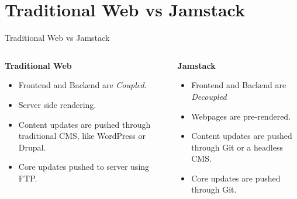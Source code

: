 \documentclass[aspectratio=169,9pt]{beamer}
\begin{document}
\section{Traditional Web vs Jamstack}
\begin{frame}{Traditional Web vs Jamstack}

\begin{columns}
\centering
\begin{column}{0.47\textwidth}
        \textbf{Traditional Web}
        \vspace{1em}
        \begin{itemize}
        \setlength{\itemsep}{.8em}
  \item Frontend and Backend are \textit{Coupled}.
            \item Server side rendering.
            \item Content updates are pushed through traditional CMS, like WordPress or Drupal.
            \item Core updates pushed to server using FTP.
        \end{itemize}
    \end{column}
    \begin{column}{0.47\textwidth}
       \textbf{ Jamstack}
       \vspace{1em}
        \begin{itemize}
        \setlength{\itemsep}{.8em}
   \item Frontend and Backend are \textit{Decoupled}
            \item Webpages are pre-rendered.
            \item Content updates are pushed through Git or a headless CMS.
            \item Core updates are pushed through Git.
        \end{itemize}
    \end{column}
\end{columns}
    
\end{frame}
\end{document}
